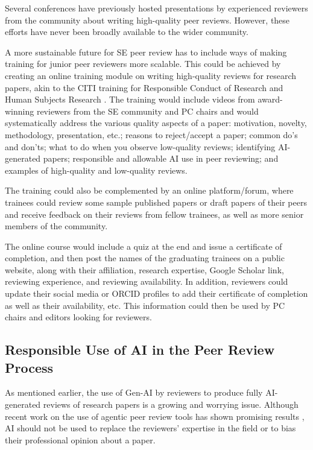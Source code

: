 \documentclass[sigconf]{acmart}
\begin{document}
Several conferences have previously hosted presentations by experienced reviewers from the community about writing high-quality peer reviews. However, these efforts have never been broadly available to the wider community.

A more sustainable future for SE peer review has to include ways of making training for junior peer reviewers more scalable. This could be achieved by creating an online training module on writing high-quality reviews for research papers, akin to the CITI training for Responsible Conduct of Research and Human Subjects Research \cite{CITI}. The training would include videos from award-winning reviewers from the SE community and PC chairs and would systematically address the various quality aspects of a paper: motivation, novelty, methodology, presentation, etc.; reasons to reject/accept a paper; common do's and don'ts; what to do when you observe low-quality reviews; identifying AI-generated papers; responsible and allowable AI use in peer reviewing; and examples of high-quality and low-quality reviews. 

The training could also be complemented by an online platform/forum, where trainees could review some sample published papers or draft papers of their peers and receive feedback on their reviews from fellow trainees, as well as more senior members of the community. 

The online course would include a quiz at the end and issue a certificate of completion, and then post the names of the graduating trainees on a public website, along with their affiliation, research expertise, Google Scholar link, reviewing experience, and reviewing availability. In addition, reviewers could update their social media or ORCID profiles to add their certificate of completion as well as their availability, etc. This information could then be used by PC chairs and editors looking for reviewers. 

\subsection{Responsible Use of AI in the Peer Review Process}

As mentioned earlier, the use of Gen-AI by reviewers to produce fully AI-generated reviews of research papers is a growing and 
worrying issue. Although recent work on the use of agentic peer review tools has shown promising results \cite{Liang2024, Ding2025, paperreviewAI}, AI should not be used to replace the reviewers' expertise in the field or to bias their professional opinion about a paper. 
\end{document}
